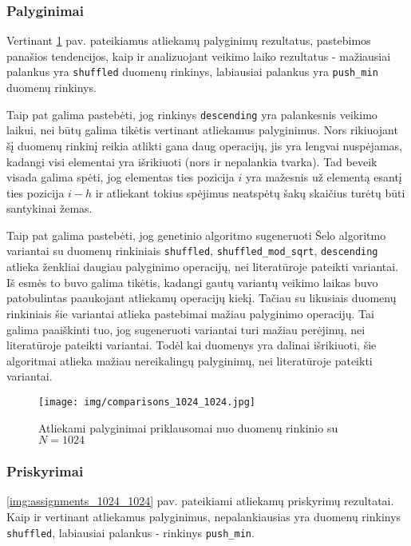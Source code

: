 \documentclass{VUMIFInfBakalaurinis}
\begin{document}
\pagebreak

\subsubsection{Palyginimai}

Vertinant \ref{img:comparisons_1024_1024} pav. pateikiamus atliekamų palyginimų rezultatus, pastebimos panašios tendencijos,
kaip ir analizuojant veikimo laiko rezultatus - mažiausiai palankus yra \verb|shuffled| duomenų rinkinys, labiausiai palankus yra \verb|push_min| duomenų rinkinys.

Taip pat galima pastebėti, jog rinkinys \verb|descending| yra palankesnis veikimo laikui, nei būtų galima tikėtis vertinant atliekamus palyginimus.
Nors rikiuojant šį duomenų rinkinį reikia atlikti gana daug operacijų, jis yra lengvai nuspėjamas,
kadangi visi elementai yra išrikiuoti (nors ir nepalankia tvarka).
Tad beveik visada galima spėti, jog elementas ties pozicija $i$ yra mažesnis už elementą esantį ties pozicija $i - h$
ir atliekant tokius spėjimus neatspėtų šakų skaičius turėtų būti santykinai žemas.

Taip pat galima pastebėti, jog genetinio algoritmo sugeneruoti Šelo algoritmo variantai su duomenų rinkiniais \verb|shuffled|, \verb|shuffled_mod_sqrt|, \verb|descending|
atlieka ženkliai daugiau palyginimo operacijų, nei literatūroje pateikti variantai.
Iš esmės to buvo galima tikėtis, kadangi gautų variantų veikimo laikas buvo patobulintas paaukojant atliekamų operacijų kiekį.
Tačiau su likusiais duomenų rinkiniais šie variantai atlieka pastebimai mažiau palyginimo operacijų.
Tai galima paaiškinti tuo, jog sugeneruoti variantai turi mažiau perėjimų, nei literatūroje pateikti variantai.
Todėl kai duomenys yra dalinai išrikiuoti, šie algoritmai atlieka mažiau nereikalingų palyginimų, nei literatūroje pateikti variantai. 

\begin{figure}[H]
  \centering
  \texttt{[image: img/comparisons\_1024\_1024.jpg]}
  \caption{Atliekami palyginimai priklausomai nuo duomenų rinkinio su $N = 1024$}
  \label{img:comparisons_1024_1024}
\end{figure}

\pagebreak

\subsubsection{Priskyrimai}

\ref{img:assignments_1024_1024} pav. pateikiami atliekamų priskyrimų rezultatai.
Kaip ir vertinant atliekamus palyginimus, nepalankiausias yra duomenų rinkinys \verb|shuffled|, labiausiai palankus - rinkinys \verb|push_min|.
\end{document}
